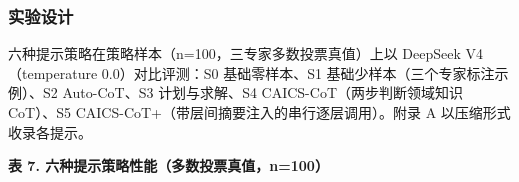 \documentclass[11pt]{article}
\begin{document}
\subsubsection{{\cjkfont 实\allowbreak 验\allowbreak 设\allowbreak 计}}
{\cjkfont 六\allowbreak 种\allowbreak 提\allowbreak 示\allowbreak 策\allowbreak 略\allowbreak 在\allowbreak 策\allowbreak 略\allowbreak 样\allowbreak 本\allowbreak （}n=100{\cjkfont ，\allowbreak 三\allowbreak 专\allowbreak 家\allowbreak 多\allowbreak 数\allowbreak 投\allowbreak 票\allowbreak 真\allowbreak 值\allowbreak ）\allowbreak 上\allowbreak 以} DeepSeek V4{\cjkfont （}temperature 0.0{\cjkfont ）\allowbreak 对\allowbreak 比\allowbreak 评\allowbreak 测\allowbreak ：}S0 {\cjkfont 基\allowbreak 础\allowbreak 零\allowbreak 样\allowbreak 本\allowbreak 、}S1 {\cjkfont 基\allowbreak 础\allowbreak 少\allowbreak 样\allowbreak 本\allowbreak （\allowbreak 三\allowbreak 个\allowbreak 专\allowbreak 家\allowbreak 标\allowbreak 注\allowbreak 示\allowbreak 例\allowbreak ）\allowbreak 、}S2 Auto-CoT{\cjkfont 、}S3 {\cjkfont 计\allowbreak 划\allowbreak 与\allowbreak 求\allowbreak 解\allowbreak 、}S4 CAICS-CoT{\cjkfont （\allowbreak 两\allowbreak 步\allowbreak 判\allowbreak 断\allowbreak 领\allowbreak 域\allowbreak 知\allowbreak 识} CoT{\cjkfont ）\allowbreak 、}S5 CAICS-CoT+{\cjkfont （\allowbreak 带\allowbreak 层\allowbreak 间\allowbreak 摘\allowbreak 要\allowbreak 注\allowbreak 入\allowbreak 的\allowbreak 串\allowbreak 行\allowbreak 逐\allowbreak 层\allowbreak 调\allowbreak 用\allowbreak ）\allowbreak 。\allowbreak 附\allowbreak 录} A {\cjkfont 以\allowbreak 压\allowbreak 缩\allowbreak 形\allowbreak 式\allowbreak 收\allowbreak 录\allowbreak 各\allowbreak 提\allowbreak 示\allowbreak 。}

\textbf{{\cjkfont 表} 7. {\cjkfont 六\allowbreak 种\allowbreak 提\allowbreak 示\allowbreak 策\allowbreak 略\allowbreak 性\allowbreak 能\allowbreak （\allowbreak 多\allowbreak 数\allowbreak 投\allowbreak 票\allowbreak 真\allowbreak 值\allowbreak ，}n=100{\cjkfont ）}}
\end{document}
